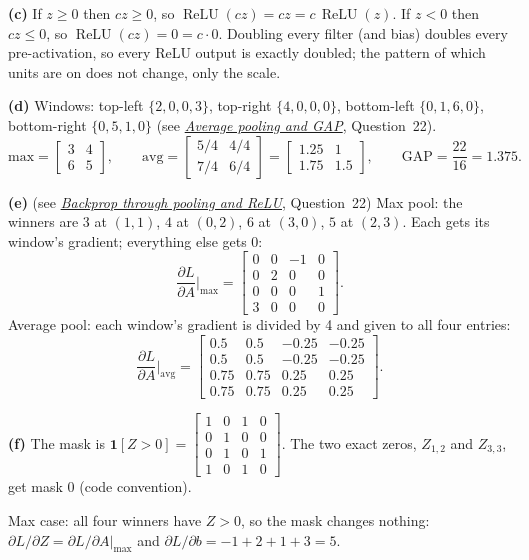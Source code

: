 \documentclass[12pt,a4paper]{article}
\newcommand{\seeconcept}[3]{(see \hyperref[#1]{\textit{#2}}, Question~#3)}
\newcommand{\relu}{\operatorname{ReLU}}
\begin{document}
\textbf{(c)} If $z\ge0$ then $cz\ge0$, so $\relu(cz)=cz=c\,\relu(z)$. If $z<0$ then $cz\le0$, so $\relu(cz)=0=c\cdot0$. Doubling every filter (and bias) doubles every pre-activation, so every ReLU output is exactly doubled; the pattern of which units are on does not change, only the scale.

\textbf{(d)} Windows: top-left $\{2,0,0,3\}$, top-right $\{4,0,0,0\}$, bottom-left $\{0,1,6,0\}$, bottom-right $\{0,5,1,0\}$ \seeconcept{c:avgpool}{Average pooling and GAP}{22}.
\[
\text{max}=\begin{bmatrix}3&4\\6&5\end{bmatrix},\qquad
\text{avg}=\begin{bmatrix}5/4&4/4\\7/4&6/4\end{bmatrix}=\begin{bmatrix}1.25&1\\1.75&1.5\end{bmatrix},\qquad
\text{GAP}=\frac{22}{16}=1.375 .
\]

\textbf{(e)} \seeconcept{c:poolback}{Backprop through pooling and ReLU}{22}
Max pool: the winners are $3$ at $(1,1)$, $4$ at $(0,2)$, $6$ at $(3,0)$, $5$ at $(2,3)$. Each gets its window's gradient; everything else gets 0:
\[
\frac{\partial L}{\partial A}\Big|_{\max}=\begin{bmatrix}0&0&-1&0\\0&2&0&0\\0&0&0&1\\3&0&0&0\end{bmatrix}.
\]
Average pool: each window's gradient is divided by 4 and given to all four entries:
\[
\frac{\partial L}{\partial A}\Big|_{\text{avg}}=\begin{bmatrix}0.5&0.5&-0.25&-0.25\\0.5&0.5&-0.25&-0.25\\0.75&0.75&0.25&0.25\\0.75&0.75&0.25&0.25\end{bmatrix}.
\]

\textbf{(f)} The mask is $\mathbf 1[Z>0]=\begin{bmatrix}1&0&1&0\\0&1&0&0\\0&1&0&1\\1&0&1&0\end{bmatrix}$. The two exact zeros, $Z_{1,2}$ and $Z_{3,3}$, get mask 0 (code convention).

Max case: all four winners have $Z>0$, so the mask changes nothing: $\partial L/\partial Z=\partial L/\partial A|_{\max}$ and $\partial L/\partial b=-1+2+1+3=5$.
\end{document}
